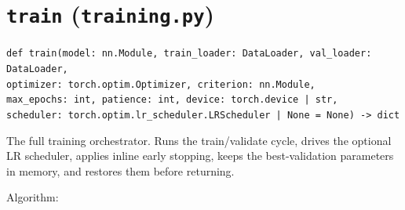 \documentclass[11pt]{article}
\newcommand{\code}[1]{\texttt{\small #1}}
\begin{document}
\section{\texttt{train} (\texttt{training.py})}

\noindent
\code{def train(model: nn.Module, train\_loader: DataLoader, val\_loader: DataLoader,}\\
\code{\hspace*{2em}optimizer: torch.optim.Optimizer, criterion: nn.Module,}\\
\code{\hspace*{2em}max\_epochs: int, patience: int, device: torch.device | str,}\\
\code{\hspace*{2em}scheduler: torch.optim.lr\_scheduler.LRScheduler | None = None) -> dict}

\medskip\noindent
The full training orchestrator. Runs the train/validate cycle, drives the
optional LR scheduler, applies inline early stopping, keeps the
best-validation parameters in memory, and restores them before returning.

\medskip\noindent
Algorithm:
\end{document}
